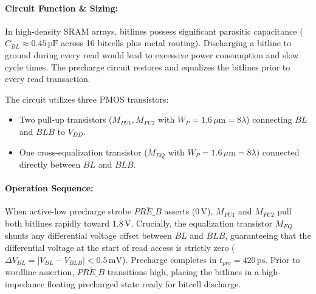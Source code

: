 \documentclass[10pt,a4paper,titlepage]{article}
\begin{document}
\paragraph{Circuit Function \& Sizing:} In high-density SRAM arrays, bitlines possess significant parasitic capacitance ($C_{BL} \approx 0.45\,\text{pF}$ across 16 bitcells plus metal routing). Discharging a bitline to ground during every read would lead to excessive power consumption and slow cycle times. The precharge circuit restores and equalizes the bitlines prior to every read transaction.

The circuit utilizes three PMOS transistors:
\begin{itemize}[itemsep=2pt]
    \item Two pull-up transistors ($M_{PU1}, M_{PU2}$ with $W_P = 1.6\,\mu\text{m} = 8\lambda$) connecting $BL$ and $BLB$ to $V_{DD}$.
    \item One cross-equalization transistor ($M_{EQ}$ with $W_P = 1.6\,\mu\text{m} = 8\lambda$) connected directly between $BL$ and $BLB$.
\end{itemize}

\paragraph{Operation Sequence:} When active-low precharge strobe $\overline{PRE\_B}$ asserts ($0\,\text{V}$), $M_{PU1}$ and $M_{PU2}$ pull both bitlines rapidly toward $1.8\,\text{V}$. Crucially, the equalization transistor $M_{EQ}$ shunts any differential voltage offset between $BL$ and $BLB$, guaranteeing that the differential voltage at the start of read access is strictly zero ($\Delta V_{BL} = |V_{BL} - V_{BLB}| < 0.5\,\text{mV}$). Precharge completes in $t_{pre} = 420\,\text{ps}$. Prior to wordline assertion, $\overline{PRE\_B}$ transitions high, placing the bitlines in a high-impedance floating precharged state ready for bitcell discharge.
\end{document}
